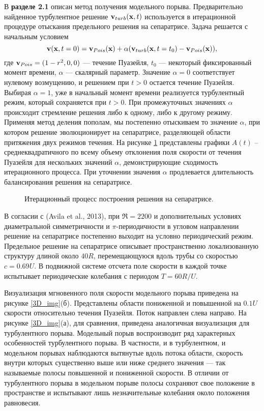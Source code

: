 В \textbf{разделе 2.1} описан метод получения модельного порыва. Предварительно найденное турбулентное решение $\mathbf{v}_{turb}(\mathbf{x},t)$ используется в итерационной процедуре отыскания предельного решения на сепаратрисе. Задача решается с начальным условием
\begin{equation} \label{edge_init_eq}
\mathbf{v}(\mathbf{x},t=0) = \mathbf{v}_{Pois}(\mathbf{x})+\alpha(\mathbf{v}_{turb}(\mathbf{x},t=t_0) - \mathbf{v}_{Pois}(\mathbf{x})),
\end{equation}
где $\mathbf{v}_{Pois}=(1-r^2,0,0)$ --- течение Пуазейля, $t_0$ --- некоторый фиксированный момент времени, $\alpha$ --- скалярный параметр. Значение $\alpha=0$ соответствует нулевому возмущению, и решением при $t > 0$ остается течение Пуазейля. Выбирая $\alpha=1$, уже в начальный момент времени реализуется турбулентный режим, который сохраняется при $t > 0$. При промежуточных значениях $\alpha$ происходит стремление решения либо к одному, либо к другому режиму. Применяя метод деления пополам, мы постепенно отыскиваем то значение $\alpha$, при котором решение эволюционирует на сепаратрисе, разделяющей области притяжения двух режимов течения. На рисунке \ref{bisection_pic} представлены графики $A(t)$ – среднеквадратичного по всему объему отклонения поля скорости от течения Пуазейля для нескольких значений $\alpha$, демонстрирующие сходимость итерационного процесса. При уточнении значения $\alpha$ продлевается длительность балансирования решения на сепаратрисе.

\begin{figure}
\caption{Итерационный процесс построения решения на сепаратрисе.}
\label{bisection_pic}
\end{figure}

В согласии с (Avila et al., 2013), при $\Re=2200$ и дополнительных условиях диаметральной симметричности и $\pi$-периодичности в угловом направлении решение на сепаратрисе постепенно выходит на условно периодический режим. Предельное решение на сепаратрисе описывает пространственно локализованную структуру длиной около $40R$, перемещающуюся вдоль трубы со скоростью $c=0.69U$. В подвижной системе отсчета поле скорости в каждой точке испытывает периодические колебания с периодом $T=60R/U$. 

Визуализация мгновенного поля скорости модельного порыва приведена на рисунке \ref{3D_img}(б). Представлены области пониженной и повышенной на $0.1U$ скорости относительно течения Пуазейля. Поток направлен слева направо. На рисунке \ref{3D_img}(а), для сравнения, приведена аналогичная визуализация для турбулентного порыва. Модельный порыв воспроизводит ряд характерных особенностей турбулентного порыва. В частности, и в турбулентном, и модельном порывах наблюдаются вытянутые вдоль потока области, скорость внутри которых существенно выше или ниже среднего значения --- так называемые полосы повышенной и пониженной скорости. В отличии от турбулентного порыва в модельном порыве полосы сохраняют свое положение в пространстве и испытывают лишь незначительные колебания около положения равновесия. 

